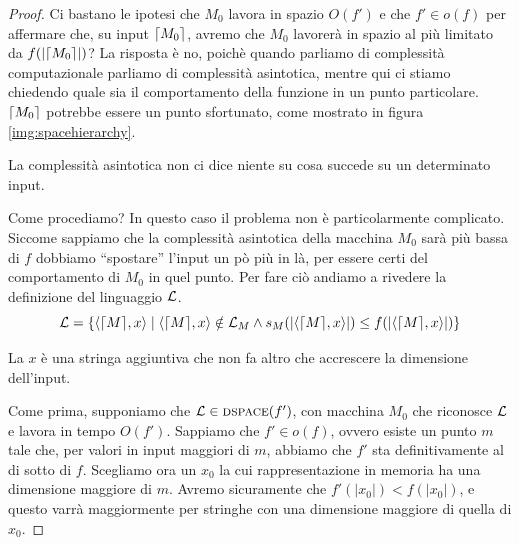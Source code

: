 \begin{proof}
    Ci bastano le ipotesi che $M_{0}$ lavora in spazio $O(f')$ e che $f' \in o(f)$ per affermare
    che, su input $\lceil M_{0} \rceil$, avremo che $M_{0}$ lavorerà in spazio al più limitato da
    $f(|\lceil M_{0} \rceil|)$? La risposta è no, poichè quando parliamo di complessità computazionale
    parliamo di complessità asintotica, mentre qui ci stiamo chiedendo quale sia il comportamento
    della funzione in un punto particolare. $\lceil M_{0} \rceil$ potrebbe essere un punto sfortunato, come
    mostrato in figura \ref{img:spacehierarchy}.

    La complessità asintotica non ci dice niente su cosa succede su un determinato input.

    Come procediamo? In questo caso il problema non è particolarmente complicato. Siccome sappiamo
    che la complessità asintotica della macchina $M_{0}$ sarà più bassa di $f$ dobbiamo
    ``spostare'' l'input un pò più in là, per essere certi del comportamento di $M_{0}$ in quel
    punto. Per fare ciò andiamo a rivedere la definizione del linguaggio $\mathcal{L}$.
    \begin{equation*}
        \mathcal{L} = \left\{\langle \lceil M \rceil, x \rangle \mid \langle \lceil M \rceil, x \rangle \notin \mathcal{L}_{M} \land
        s_{M}(|\langle \lceil M \rceil, x \rangle|) \leq f(|\langle \lceil M \rceil, x \rangle|)\right\}
    \end{equation*}

    La $x$ è una stringa aggiuntiva che non fa altro che accrescere la dimensione dell'input.

    Come prima, supponiamo che $\mathcal{L} \in \textsc{dspace}(f')$, con macchina $M_{0}$ che riconosce $\mathcal{L}$ e
    lavora in tempo $O(f')$. Sappiamo che $f' \in o(f)$, ovvero esiste un punto $m$ tale che, per
    valori in input maggiori di $m$, abbiamo che $f'$ sta definitivamente al di sotto di $f$.
    Scegliamo ora un $x_{0}$ la cui rappresentazione in memoria ha una dimensione maggiore di $m$.
    Avremo sicuramente che $f'(|x_{0}|) < f(|x_{0}|)$, e questo varrà maggiormente per stringhe con
    una dimensione maggiore di quella di $x_{0}$.


\end{proof}
